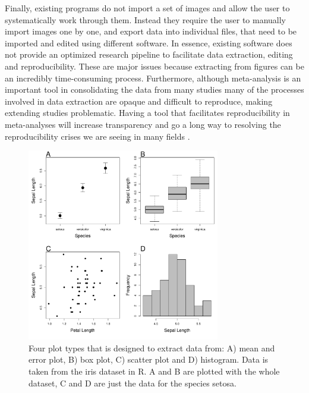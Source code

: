 \documentclass[article]{jss}
\begin{document}
Finally, existing programs do not import a set of images and allow the user to systematically work through them. Instead they require the user to manually import images one by one, and export data into individual files, that need to be imported and edited using different software. In essence, existing software does not provide an optimized research pipeline to facilitate data extraction, editing and reproducibility. These are major issues because extracting from figures can be an incredibly time-consuming process. Furthermore, although meta-analysis is an important tool in consolidating the data from many studies many of the processes involved in data extraction are opaque and difficult to reproduce, making extending studies problematic. Having a tool that facilitates reproducibility in meta-analyses will increase transparency and go a long way to resolving the reproducibility crises we are seeing in many fields \citep{peng_reproducible_2006, peng_reproducible_2011, sandve_ten_2013, Parker2016}.


\begin{figure}[bt!] 
\centering
 \includegraphics[width=0.75\textwidth]{fig_plot_type.pdf} 
 \caption{Four plot types that  is designed to extract data from: A) mean and error plot, B) box plot, C) scatter plot and D) histogram. Data is taken from the iris dataset in R. A and B are plotted with the whole dataset, C and D are just the data for the species setosa.}
\label{fig:plot_type}
\end{figure}
\end{document}
